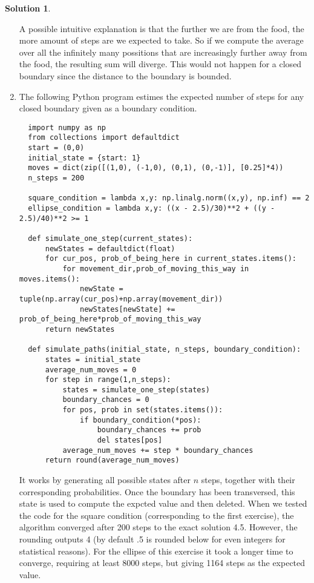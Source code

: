 \documentclass{article}
\theoremstyle{plain}
\theoremstyle{definition}
\newtheorem*{sol*}{Solution}
\begin{document}
\begin{sol*}
\begin{enumerate}
    A possible intuitive explanation is that the further we are from the food, the more amount of steps are we expected to take. So if we compute the average over all the infinitely many possitions that are increasingly further away from the food, the resulting sum will diverge. This would not happen for a closed boundary since the distance to the boundary is bounded.
    \item The following Python program estimes the expected number of steps for any closed boundary given as a boundary condition. 


\lstset{language=Python,
showstringspaces=false,
tab=\rightarrowfill}
\begin{lstlisting}
  import numpy as np
  from collections import defaultdict
  start = (0,0)
  initial_state = {start: 1}
  moves = dict(zip([(1,0), (-1,0), (0,1), (0,-1)], [0.25]*4))
  n_steps = 200
  
  square_condition = lambda x,y: np.linalg.norm((x,y), np.inf) == 2
  ellipse_condition = lambda x,y: ((x - 2.5)/30)**2 + ((y - 2.5)/40)**2 >= 1
  
  def simulate_one_step(current_states):
      newStates = defaultdict(float)
      for cur_pos, prob_of_being_here in current_states.items():
          for movement_dir,prob_of_moving_this_way in moves.items():
              newState = tuple(np.array(cur_pos)+np.array(movement_dir))
              newStates[newState] += prob_of_being_here*prob_of_moving_this_way
      return newStates
  
  def simulate_paths(initial_state, n_steps, boundary_condition):
      states = initial_state
      average_num_moves = 0
      for step in range(1,n_steps):
          states = simulate_one_step(states)
          boundary_chances = 0
          for pos, prob in set(states.items()):    
              if boundary_condition(*pos):
                  boundary_chances += prob
                  del states[pos]
          average_num_moves += step * boundary_chances
      return round(average_num_moves)
\end{lstlisting}
It works by generating all possible states after $n$ steps, together with their corresponding probabilities. Once the boundary has been transversed, this state is used to compute the expcted value and then deleted. When we tested the code for the square condition (corresponding to the first exercise), the algorithm converged after 200 steps to the exact solution 4.5. However, the rounding outputs 4 (by default .5 is rounded below for even integers for statistical reasons). For the ellipse of this exercise it took a longer time to converge, requiring at least 8000 steps, but giving 1164 steps as the expected value.
 
\end{enumerate}
\end{sol*}
\end{document}
